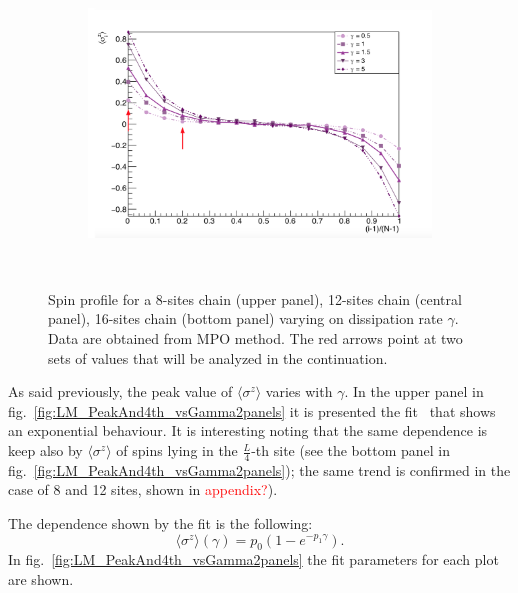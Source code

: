 \begin{figure}[H]
\begin{subfigure}{\columnwidth}
    \label{fig:12sites_LMvsGamma}
\end{subfigure}\\
\begin{subfigure}{\columnwidth}
\centering
    \includegraphics[scale=0.34]{Figures/16sites/prova.png}
    \label{fig:16sites_LMvsGamma}
\end{subfigure}\\
\captionsetup{width=1.\linewidth}
\caption{Spin profile for a 8-sites chain (upper panel), 12-sites chain (central panel), 16-sites chain (bottom panel) varying on dissipation rate $\gamma$. Data are obtained from MPO method. The red arrows point at two sets of values that will be analyzed in the continuation.}
\label{fig:LMvsGamma3panelsSizes}
\end{figure}

As said previously, the peak value of $\langle\sigma^z\rangle$ varies with $\gamma$. In the upper panel in fig.~\ref{fig:LM_PeakAnd4th_vsGamma2panels} it is presented the fit~\cite{root_cern} that shows an exponential behaviour. It is interesting noting that the same dependence is keep also by $\langle\sigma^z\rangle$ of spins lying in the $\frac{L}{4}$-th site (see the bottom panel in fig.~\ref{fig:LM_PeakAnd4th_vsGamma2panels}); the same trend is confirmed in the case of 8 and 12 sites, shown in \textcolor{red}{appendix?}).

The dependence shown by the fit is the following:
\begin{equation*}
    \langle \sigma^z \rangle(\gamma) = p_0 (1- e^{-p_1\gamma}).
\end{equation*}
In fig.~\ref{fig:LM_PeakAnd4th_vsGamma2panels} the fit parameters for each plot are shown.

